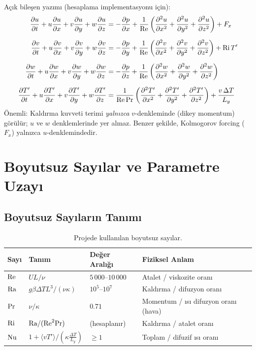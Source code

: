 Açık bileşen yazımı (hesaplama implementasyonu için):
\begin{align}
    \frac{\partial u}{\partial t} + u\frac{\partial u}{\partial x} + v\frac{\partial u}{\partial y} + w\frac{\partial u}{\partial z}
    &= -\frac{\partial p}{\partial x} + \frac{1}{\mathrm{Re}}\left(\frac{\partial^2 u}{\partial x^2} + \frac{\partial^2 u}{\partial y^2} + \frac{\partial^2 u}{\partial z^2}\right) + F_x
    \label{eq:u_component} \\[6pt]
    \frac{\partial v}{\partial t} + u\frac{\partial v}{\partial x} + v\frac{\partial v}{\partial y} + w\frac{\partial v}{\partial z}
    &= -\frac{\partial p}{\partial y} + \frac{1}{\mathrm{Re}}\left(\frac{\partial^2 v}{\partial x^2} + \frac{\partial^2 v}{\partial y^2} + \frac{\partial^2 v}{\partial z^2}\right) + \mathrm{Ri} \, T'
    \label{eq:v_component} \\[6pt]
    \frac{\partial w}{\partial t} + u\frac{\partial w}{\partial x} + v\frac{\partial w}{\partial y} + w\frac{\partial w}{\partial z}
    &= -\frac{\partial p}{\partial z} + \frac{1}{\mathrm{Re}}\left(\frac{\partial^2 w}{\partial x^2} + \frac{\partial^2 w}{\partial y^2} + \frac{\partial^2 w}{\partial z^2}\right)
    \label{eq:w_component} \\[6pt]
    \frac{\partial T'}{\partial t} + u\frac{\partial T'}{\partial x} + v\frac{\partial T'}{\partial y} + w\frac{\partial T'}{\partial z}
    &= \frac{1}{\mathrm{Re} \, \mathrm{Pr}}\left(\frac{\partial^2 T'}{\partial x^2} + \frac{\partial^2 T'}{\partial y^2} + \frac{\partial^2 T'}{\partial z^2}\right) + \frac{v \, \Delta T}{L_y}
    \label{eq:Tprime_component}
\end{align}
Önemli: Kaldırma kuvveti terimi \textit{yalnızca} $v$-denkleminde (dikey momentum) görülür; $u$ ve $w$ denklemlerinde yer almaz. Benzer şekilde, Kolmogorov forcing ($F_x$) yalnızca $u$-denklemindedir.


\section{Boyutsuz Sayılar ve Parametre Uzayı}
\label{sec:parametre_uzayi}

\subsection{Boyutsuz Sayıların Tanımı}

\begin{table}[H]
\centering
\caption{Projede kullanılan boyutsuz sayılar.}
\label{tab:boyutsuz_sayilar}
\begin{tabular}{@{}llll@{}}
\toprule
\textbf{Sayı} & \textbf{Tanım} & \textbf{Değer Aralığı} & \textbf{Fiziksel Anlam} \\
\midrule
$\mathrm{Re}$ & $UL/\nu$ & $5\,000$--$10\,000$ & Atalet / viskozite oranı \\
$\mathrm{Ra}$ & $g\beta\Delta T L^3 / (\nu\kappa)$ & $10^5$--$10^7$ & Kaldırma / difuzyon oranı \\
$\mathrm{Pr}$ & $\nu / \kappa$ & $0.71$ & Momentum / ısı difuzyon oranı (hava) \\
$\mathrm{Ri}$ & $\mathrm{Ra} / (\mathrm{Re}^2 \mathrm{Pr})$ & (hesaplanır) & Kaldırma / atalet oranı \\
$\mathrm{Nu}$ & $1 + \langle v T' \rangle \big/ \left(\kappa \frac{\Delta T}{L_y}\right)$ & $\geq 1$ & Toplam / difuzif ısı oranı \\
\bottomrule
\end{tabular}
\end{table}

